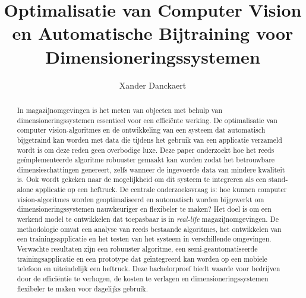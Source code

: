 \documentclass{hogent-article}
\title{Optimalisatie van Computer Vision en Automatische Bijtraining voor Dimensioneringssystemen}
\author{Xander Danckaert}
\begin{document}
\begin{abstract}
  In magazijnomgevingen is het meten van objecten met behulp van dimensioneringssystemen essentieel voor een efficiënte werking. De optimalisatie van computer vision-algoritmes en de ontwikkeling van een systeem dat automatisch bijgetraind kan worden met data die tijdens het gebruik van een applicatie verzameld wordt is om deze reden geen overbodige luxe. Deze paper onderzoekt hoe het reeds geïmplementeerde algoritme robuuster gemaakt kan worden zodat het betrouwbare dimensieschattingen genereert, zelfs wanneer de ingevoerde data van mindere kwaliteit is. Ook wordt gekeken naar de mogelijkheid om dit systeem te integreren als een stand-alone applicatie op een heftruck. De centrale onderzoeksvraag is: hoe kunnen computer vision-algoritmes worden geoptimaliseerd en automatisch worden bijgewerkt om dimensioneringssystemen nauwkeuriger en flexibeler te maken? Het doel is om een werkend model te ontwikkelen dat toepasbaar is in \textit{real-life} magazijnomgevingen. De methodologie omvat een analyse van reeds bestaande algoritmes, het ontwikkelen van een trainingsapplicatie en het testen van het systeem in verschillende omgevingen. Verwachte resultaten zijn een robuuster algoritme, een semi-geautomatiseerde trainingsapplicatie en een prototype dat geïntegreerd kan worden op een mobiele telefoon en uiteindelijk een heftruck. Deze bachelorproef biedt waarde voor bedrijven door de efficiëntie te verhogen, de kosten te verlagen en dimensioneringssystemen flexibeler te maken voor dagelijks gebruik.
\end{abstract}
\tableofcontents



\printbibliography[heading=bibintoc]
\end{document}
